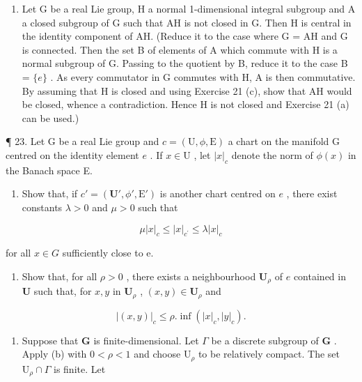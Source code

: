 \begin{enumerate}
\def\labelenumi{\arabic{enumi}.}
\setcounter{enumi}{21}
\tightlist
\item
  Let G be a real Lie group, H a normal 1-dimensional integral subgroup and A a closed subgroup of G such that AH is not closed in G. Then H is central in the identity component of AH. (Reduce it to the case where G = AH and G is connected. Then the set B of elements of A which commute with H is a normal subgroup of G. Passing to the quotient by B, reduce it to the case B = \(\{e\}\) . As every commutator in G commutes with H, A is then commutative. By assuming that H is closed and using Exercise 21 (c), show that AH would be closed, whence a contradiction. Hence H is not closed and Exercise 21 (a) can be used.)
\end{enumerate}

¶ 23. Let G be a real Lie group and \(c = (\mathrm{U}, \phi, \mathrm{E})\) a chart on the manifold G centred on the identity element \(e\) . If \(x \in \mathrm{U}\) , let \(|x|_c\) denote the norm of \(\phi(x)\) in the Banach space E.

\begin{enumerate}
\def\labelenumi{(\alph{enumi})}
\tightlist
\item
  Show that, if \(c' = (\mathbf{U}', \phi', \mathrm{E}')\) is another chart centred on \(e\) , there exist constants \(\lambda > 0\) and \(\mu > 0\) such that
\end{enumerate}

\[
\mu | x | _ {c} \leqslant | x | _ {c ^ {\prime}} \leqslant \lambda | x | _ {c}
\]

for all \(x \in G\) sufficiently close to e.

\begin{enumerate}
\def\labelenumi{(\alph{enumi})}
\setcounter{enumi}{1}
\tightlist
\item
  Show that, for all \(\rho > 0\) , there exists a neighbourhood \(\mathbf{U}_{\rho}\) of \(e\) contained in \(\mathbf{U}\) such that, for \(x, y\) in \(\mathbf{U}_{\rho}\) , \((x, y) \in \mathbf{U}_{\rho}\) and
\end{enumerate}

\[
\left| (x, y) \right| _ {c} \leqslant \rho . \inf (\left| x \right| _ {c}, \left| y \right| _ {c}).
\]

\begin{enumerate}
\def\labelenumi{(\alph{enumi})}
\setcounter{enumi}{2}
\tightlist
\item
  Suppose that \(\mathbf{G}\) is finite-dimensional. Let \(\Gamma\) be a discrete subgroup of \(\mathbf{G}\) . Apply (b) with \(0 < \rho < 1\) and choose \(\mathrm{U}_{\rho}\) to be relatively compact. The set \(\mathrm{U}_{\rho} \cap \Gamma\) is finite. Let
\end{enumerate}

